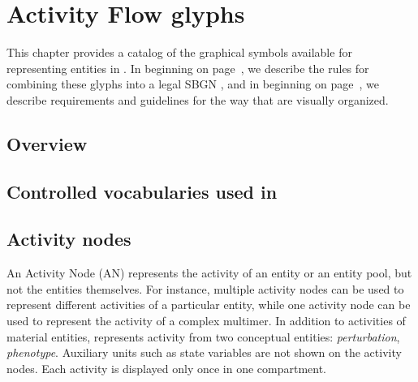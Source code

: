 \chapter{Activity Flow glyphs}


This chapter provides a catalog of the graphical symbols available for representing entities in \AFs. In  beginning on page~\pageref{chp:af:grammar}, we describe the rules for combining these glyphs into a legal SBGN \AF, and in  beginning on page~\pageref{chp:af:layout}, we describe requirements and guidelines for the way that \AFms are visually organized.

\section{Overview}



\section{Controlled vocabularies used in \SBGNAFLone}\label{af:sec:CVs}




\section{Activity nodes}\label{sec:af:ANs}

An Activity Node (AN) represents the activity of an entity or an entity pool, but not the entities themselves. For instance, multiple activity nodes can be used to represent different activities of a particular entity, while one activity node can be used to represent the activity of a complex multimer. In addition to activities of material entities, \SBGNAFLone represents activity from two conceptual entities: \emph{perturbation}, \emph{phenotype}.  Auxiliary units such as state variables are not shown on the activity nodes.  Each activity is displayed only once in one compartment.


